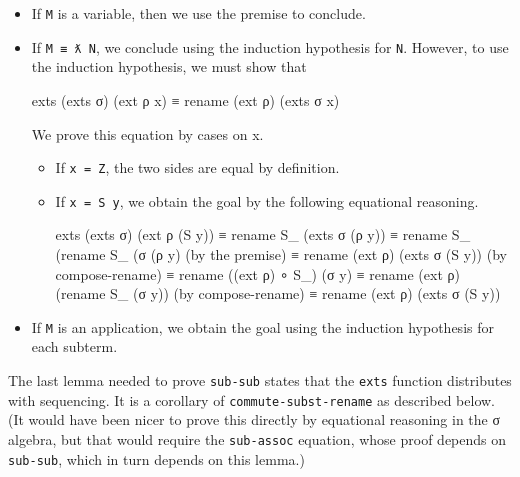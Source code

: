 \begin{itemize}
\item
  If \texttt{M} is a variable, then we use the premise to conclude.
\item
  If \texttt{M\ ≡\ ƛ\ N}, we conclude using the induction hypothesis for
  \texttt{N}. However, to use the induction hypothesis, we must show
  that

  \begin{myDisplay}
    exts (exts σ) (ext ρ x) ≡ rename (ext ρ) (exts σ x)
  \end{myDisplay}

  We prove this equation by cases on x.

  \begin{itemize}
  \item
    If \texttt{x\ =\ Z}, the two sides are equal by definition.
  \item
    If \texttt{x\ =\ S\ y}, we obtain the goal by the following
    equational reasoning.

    \begin{myDisplay}
      exts (exts σ) (ext ρ (S y))
    ≡ rename S_ (exts σ (ρ y))
    ≡ rename S_ (rename S_ (σ (ρ y)      (by the premise)
    ≡ rename (ext ρ) (exts σ (S y))      (by compose-rename)
    ≡ rename ((ext ρ) ∘ S_) (σ y)
    ≡ rename (ext ρ) (rename S_ (σ y))   (by compose-rename)
    ≡ rename (ext ρ) (exts σ (S y))
    \end{myDisplay}
  \end{itemize}
\item
  If \texttt{M} is an application, we obtain the goal using the
  induction hypothesis for each subterm.
\end{itemize}

The last lemma needed to prove \texttt{sub-sub} states that the
\texttt{exts} function distributes with sequencing. It is a corollary of
\texttt{commute-subst-rename} as described below. (It would have been
nicer to prove this directly by equational reasoning in the σ algebra,
but that would require the \texttt{sub-assoc} equation, whose proof
depends on \texttt{sub-sub}, which in turn depends on this lemma.)


